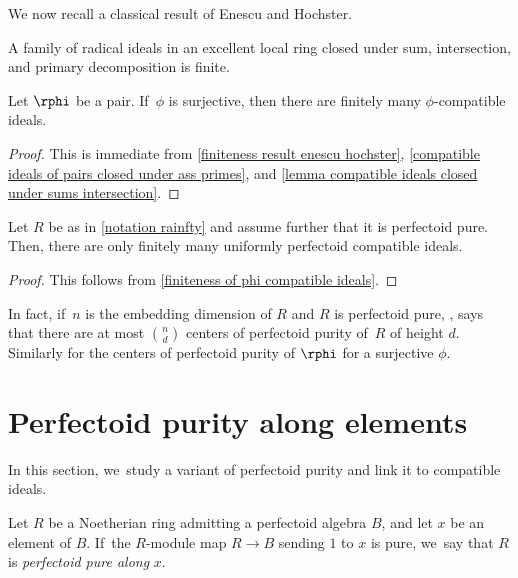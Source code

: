 We now recall a classical result of Enescu and Hochster.

\begin{proposition}\label{finiteness result enescu hochster}
A family of radical ideals in an excellent local ring closed under sum,
intersection, and primary decomposition is finite.
\end{proposition}

\begin{corollary}\label{finiteness of phi compatible ideals}
Let $\rphi$ be a pair. If~$\phi$ is surjective, then there are finitely many $\phi$-compatible ideals.
\end{corollary}

\begin{proof}
This is immediate from \autoref{finiteness result enescu hochster}, \autoref{compatible ideals of pairs closed under ass primes}, and \autoref{lemma compatible ideals closed under sums intersection}.
\end{proof}

\begin{corollary}\label{finiteness of uniformly compatible ideals}
Let $R$ be as in \autoref{notation rainfty} and assume further that it is perfectoid pure. Then, there are only finitely many uniformly perfectoid compatible ideals.
\end{corollary}

\begin{proof}
This follows from \autoref{finiteness of phi compatible ideals}.
\end{proof}
\begin{remark}\label{remark bound number cpps}
In fact, if~$n$ is the embedding dimension of $R$ and $R$ is perfectoid pure, \cite[Th.\,4.2]{SchwedeTuckerNumberOfFSplit}, says that there are at most $\binom{n}{d}$ centers of perfectoid purity of~$R$ of height $d$. Similarly for the centers of perfectoid purity of $\rphi$ for a surjective $\phi$.
\end{remark}

\section{Perfectoid purity along elements}

In this section, we~study a variant of perfectoid purity and link it to compatible ideals.

\begin{definition}
Let $R$ be a Noetherian ring admitting a perfectoid algebra $B$, and let $x$ be an element of $B$. If~the $R$\nobreakdash-module map $R\to B$ sending $1$ to $x$ is pure, we~say that $R$ is \emph{perfectoid pure along} $x$.
\end{definition}

